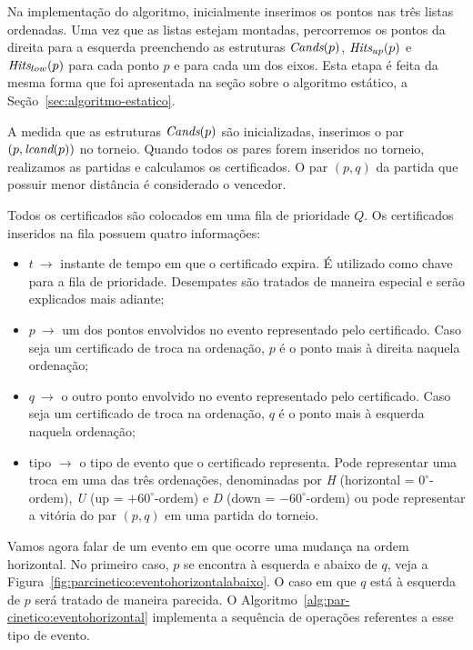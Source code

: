 Na implementação do algoritmo, inicialmente inserimos os pontos nas três listas ordenadas.
Uma vez que as listas estejam montadas, percorremos os pontos da direita para a esquerda
preenchendo as estruturas $\textit{Cands}(p)$, $\textit{Hits}_{up}(p)$ e $\textit{Hits}_{low}(p)$ para cada ponto $p$ e
para cada um dos eixos.
Esta etapa é feita da mesma forma que foi apresentada na seção sobre o algoritmo estático, a
Seção~\ref{sec:algoritmo-estatico}.

A medida que as estruturas $\textit{Cands}(p)$ são inicializadas, inserimos o par $(p, \textit{lcand}(p))$ no
torneio.
Quando todos os pares forem inseridos no torneio, realizamos as partidas e calculamos os
certificados.
O par $(p, q)$ da partida que possuir menor distância é considerado o vencedor.

Todos os certificados são colocados em uma fila de prioridade $Q$.
Os certificados inseridos na fila possuem quatro informações:
\begin{itemize}
    \item $t~\rightarrow$ instante de tempo em que o certificado
    expira.
    É utilizado como chave para a fila de prioridade.
    Desempates são tratados de maneira especial e serão explicados
    mais adiante;
    \item $p~\rightarrow$ um dos pontos envolvidos no evento
    representado pelo certificado.
    Caso seja um certificado de troca na ordenação, $p$ é o ponto mais à direita naquela ordenação;
    \item $q~\rightarrow$ o outro ponto envolvido no evento representado pelo certificado.
    Caso seja um certificado de troca na ordenação, $q$ é o ponto mais à esquerda naquela
    ordenação;
    \item tipo $ \rightarrow$ o tipo de evento que o certificado representa.
    Pode representar uma troca em uma das três ordenações, denominadas por \textit{H} (horizontal =
    $0^\circ$-ordem), \textit{U} (up = $+60^\circ$-ordem) e \textit{D} (down = $-60^\circ$-ordem) ou pode
    representar a vitória do par $(p, q)$ em uma partida do torneio.
\end{itemize}



Vamos agora falar de um evento em que ocorre uma mudança na ordem horizontal.
No primeiro caso, $p$ se encontra à esquerda e abaixo de $q$, veja a
Figura~\ref{fig:parcinetico:eventohorizontalabaixo}.
O caso em que $q$ está à esquerda de $p$ será tratado de maneira parecida.
O Algoritmo~\ref{alg:par-cinetico:eventohorizontal} implementa a sequência de operações referentes
a esse tipo de evento.

